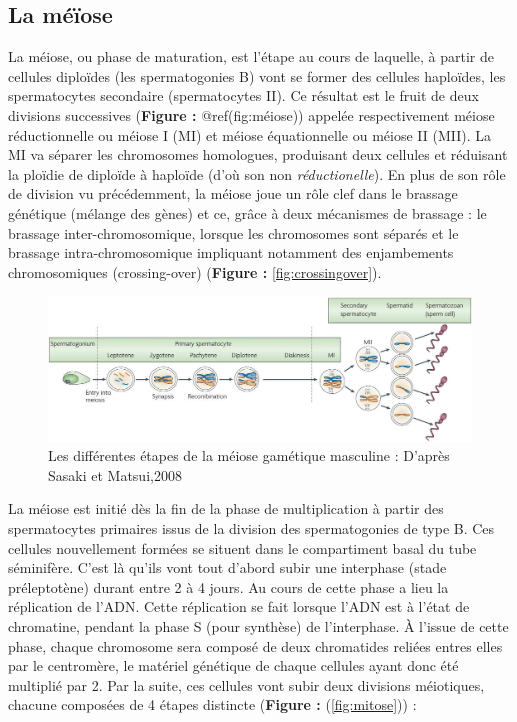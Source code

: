 \documentclass[12pt,twoside]{reedthesis}
\theoremstyle{definition}
\theoremstyle{definition}
\theoremstyle{remark}
\begin{document}
  \subsection{La méïose}\label{la-meiose}
  
  La méiose, ou phase de maturation, est l'étape au cours de laquelle, à
  partir de cellules diploïdes (les spermatogonies B) vont se former des
  cellules haploïdes, les spermatocytes secondaire (spermatocytes II). Ce
  résultat est le fruit de deux divisions successives (\textbf{Figure :
  }@ref(fig:méiose)) appelée respectivement méiose réductionnelle ou
  méiose I (MI) et méiose équationnelle ou méiose II (MII). La MI va
  séparer les chromosomes homologues, produisant deux cellules et
  réduisant la ploïdie de diploïde à haploïde (d'où son non
  \emph{réductionelle}). En plus de son rôle de division vu précédemment,
  la méiose joue un rôle clef dans le brassage génétique (mélange des
  gènes) et ce, grâce à deux mécanismes de brassage : le brassage
  inter-chromosomique, lorsque les chromosomes sont séparés et le brassage
  intra-chromosomique impliquant notamment des enjambements chromosomiques
  (crossing-over) (\textbf{Figure : }\ref{fig:crossingover}).
  
  \begin{figure}
  
  {\centering \includegraphics[scale=0.35]{figure/Meiosis_Stages} 
  
  }
  
  \caption[Les différentes étapes de la méiose gamétique masculine]{Les différentes étapes de la méiose gamétique masculine : D’après Sasaki et Matsui,2008}\label{fig:meiose}
  \end{figure}
  
  La méiose est initié dès la fin de la phase de multiplication à partir
  des spermatocytes primaires issus de la division des spermatogonies de
  type B. Ces cellules nouvellement formées se situent dans le
  compartiment basal du tube séminifère. C'est là qu'ils vont tout d'abord
  subir une interphase (stade préleptotène) durant entre 2 à 4 jours. Au
  cours de cette phase a lieu la réplication de l'ADN. Cette réplication
  se fait lorsque l'ADN est à l'état de chromatine, pendant la phase S
  (pour synthèse) de l'interphase. À l'issue de cette phase, chaque
  chromosome sera composé de deux chromatides reliées entres elles par le
  centromère, le matériel génétique de chaque cellules ayant donc été
  multiplié par 2. Par la suite, ces cellules vont subir deux divisions
  méiotiques, chacune composées de 4 étapes distincte (\textbf{Figure :
  }(\ref{fig:mitose})) :
  
\end{document}
